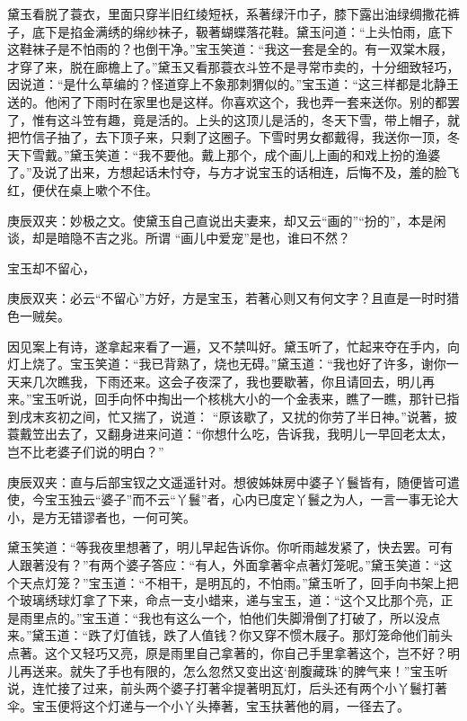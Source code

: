 \begin{parag}
    黛玉看脱了蓑衣，里面只穿半旧红绫短袄，系著绿汗巾子，膝下露出油绿绸撒花裤子，底下是掐金满绣的绵纱袜子，靸著蝴蝶落花鞋。黛玉问道：“上头怕雨，底下这鞋袜子是不怕雨的？也倒干净。”宝玉笑道：“我这一套是全的。有一双棠木屐，才穿了来，脱在廊檐上了。”黛玉又看那蓑衣斗笠不是寻常市卖的，十分细致轻巧，因说道：“是什么草编的？怪道穿上不象那刺猬似的。”宝玉道：“这三样都是北静王送的。他闲了下雨时在家里也是这样。你喜欢这个，我也弄一套来送你。别的都罢了，惟有这斗笠有趣，竟是活的。上头的这顶儿是活的，冬天下雪，带上帽子，就把竹信子抽了，去下顶子来，只剩了这圈子。下雪时男女都戴得，我送你一顶，冬天下雪戴。”黛玉笑道：“我不要他。戴上那个，成个画儿上画的和戏上扮的渔婆了。”及说了出来，方想起话未忖夺，与方才说宝玉的话相连，后悔不及，羞的脸飞红，便伏在桌上嗽个不住。\begin{note}庚辰双夹：妙极之文。使黛玉自己直说出夫妻来，却又云“画的”“扮的”，本是闲谈，却是暗隐不吉之兆。所谓 “画儿中爱宠”是也，谁曰不然？\end{note}
\end{parag}


\begin{parag}
    宝玉却不留心，\begin{note}庚辰双夹：必云“不留心”方好，方是宝玉，若著心则又有何文字？且直是一时时猎色一贼矣。\end{note}因见案上有诗，遂拿起来看了一遍，又不禁叫好。黛玉听了，忙起来夺在手内，向灯上烧了。宝玉笑道：“我已背熟了，烧也无碍。”黛玉道：“我也好了许多，谢你一天来几次瞧我，下雨还来。这会子夜深了，我也要歇著，你且请回去，明儿再来。”宝玉听说，回手向怀中掏出一个核桃大小的一个金表来，瞧了一瞧，那针已指到戌末亥初之间，忙又揣了，说道： “原该歇了，又扰的你劳了半日神。”说著，披蓑戴笠出去了，又翻身进来问道：“你想什么吃，告诉我，我明儿一早回老太太，岂不比老婆子们说的明白？”\begin{note}庚辰双夹：直与后部宝钗之文遥遥针对。想彼姊妹房中婆子丫鬟皆有，随便皆可遣使，今宝玉独云“婆子”而不云“丫鬟”者，心内已度定丫鬟之为人，一言一事无论大小，是方无错谬者也，一何可笑。\end{note}黛玉笑道：“等我夜里想著了，明儿早起告诉你。你听雨越发紧了，快去罢。可有人跟著没有？”有两个婆子答应：“有人，外面拿著伞点著灯笼呢。”黛玉笑道：“这个天点灯笼？”宝玉道：“不相干，是明瓦的，不怕雨。”黛玉听了，回手向书架上把个玻璃绣球灯拿了下来，命点一支小蜡来，递与宝玉，道：“这个又比那个亮，正是雨里点的。”宝玉道：“我也有这么一个，怕他们失脚滑倒了打破了，所以没点来。”黛玉道：“跌了灯值钱，跌了人值钱？你又穿不惯木屐子。那灯笼命他们前头点著。这个又轻巧又亮，原是雨里自己拿著的，你自己手里拿著这个，岂不好？明儿再送来。就失了手也有限的，怎么忽然又变出这‘剖腹藏珠’的脾气来！”宝玉听说，连忙接了过来，前头两个婆子打著伞提著明瓦灯，后头还有两个小丫鬟打著伞。宝玉便将这个灯递与一个小丫头捧著，宝玉扶著他的肩，一径去了。
\end{parag}


